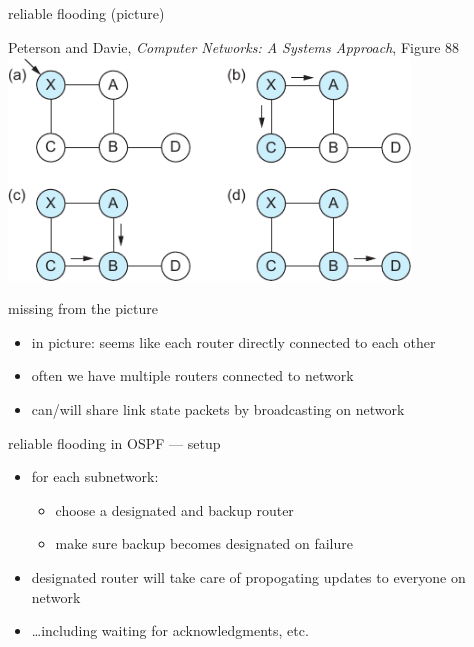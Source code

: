 
\begin{frame}{reliable flooding (picture)}

{\small Peterson and Davie, \textit{Computer Networks: A Systems Approach}, Figure 88}
\includegraphics[width=0.8\textwidth]{../routing/sysapproach-fig88}
\end{frame}

\begin{frame}{missing from the picture}
    \begin{itemize}
    \item in picture: seems like each router directly connected to each other
    \item often we have multiple routers connected to network
    \item can/will share link state packets by broadcasting on network
    \end{itemize}
\end{frame}

\begin{frame}{reliable flooding in OSPF --- setup}
    \begin{itemize}
    \item for each subnetwork:
        \begin{itemize}
        \item choose a designated and backup router
        \item make sure backup becomes designated on failure
        \end{itemize}
    \item designated router will take care of propogating updates to everyone on network
    \item \ldots including waiting for acknowledgments, etc.
    \end{itemize}
\end{frame}

